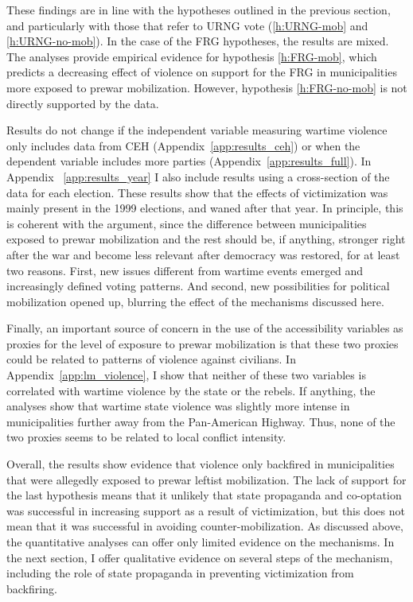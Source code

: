 \documentclass[12pt, notitlepage]{article}
\begin{document}
These findings are in line with the hypotheses outlined in the previous section, and particularly with those that refer to URNG vote (\ref{h:URNG-mob} and \ref{h:URNG-no-mob}).
In the case of the FRG hypotheses, the results are mixed.
The analyses provide empirical evidence for hypothesis \ref{h:FRG-mob}, which predicts a decreasing effect of violence on support for the FRG in municipalities more exposed to prewar mobilization.
However, hypothesis \ref{h:FRG-no-mob} is not directly supported by the data.

Results do not change if the independent variable measuring wartime violence only includes data from CEH (Appendix~\ref{app:results_ceh}) or when the dependent variable includes more parties (Appendix~\ref{app:results_full}).
In Appendix ~\ref{app:results_year} I also include results using a cross-section of the data for each election.
These results show that the effects of victimization was mainly present in the 1999 elections, and waned after that year.
In principle, this is coherent with the argument, since the difference between municipalities exposed to prewar mobilization and the rest should be, if anything, stronger right after the war and become less relevant after democracy was restored, for at least two reasons.
First, new issues different from wartime events emerged and increasingly defined voting patterns.
And second, new possibilities for political mobilization opened up, blurring the effect of the mechanisms discussed here.

Finally, an important source of concern in the use of the accessibility variables as proxies for the level of exposure to prewar mobilization is that these two proxies could be related to patterns of violence against civilians.
In Appendix~\ref{app:lm_violence}, I show that neither of these two variables is correlated with wartime violence by the state or the rebels.
If anything, the analyses show that wartime state violence was slightly more intense in municipalities further away from the Pan-American Highway.
Thus, none of the two proxies seems to be related to local conflict intensity.

Overall, the results show evidence that violence only backfired in municipalities that were allegedly exposed to prewar leftist mobilization.
The lack of support for the last hypothesis means that it unlikely that state propaganda and co-optation was successful in increasing support as a result of victimization, but this does not mean that it was successful in avoiding counter-mobilization.
As discussed above, the quantitative analyses can offer only limited evidence on the mechanisms.
In the next section, I offer qualitative evidence on several steps of the mechanism, including the role of state propaganda in preventing victimization from backfiring.
\end{document}
